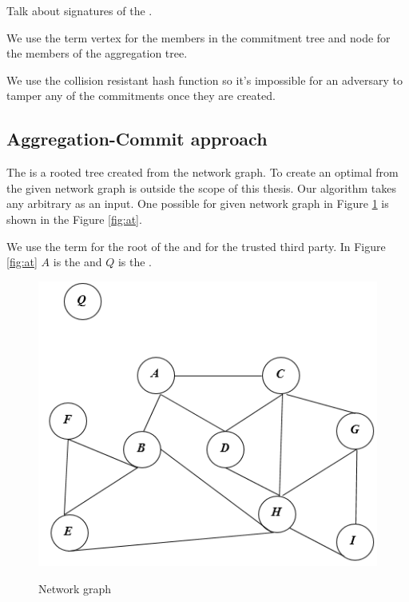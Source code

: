 	Talk about signatures of the \payloads.

	We use the term vertex for the members in the commitment tree and node for the members of the aggregation tree.
	
	We use the collision resistant hash function so it's impossible for an adversary to tamper any of the commitments once they are created.

	\subsection{Aggregation-Commit approach}
		The \at is a rooted tree created from the network graph. To create an optimal \at from the given network graph is outside the scope of this thesis. Our algorithm takes any arbitrary \at as an input. One possible \at for given network graph in Figure \ref{fig:ng} is shown in the Figure \ref{fig:at}.

		We use the term \bs for the root of the \at and \q for the trusted third party. In Figure \ref{fig:at} $A$ is the \bs and $Q$ is the \q.
		
		\begin{figure}[hp]
			\centering
			\includegraphics[scale = 0.6]{images/network-graph.png}\\
			\caption{Network graph}
			\label{fig:ng}
		\end{figure}

